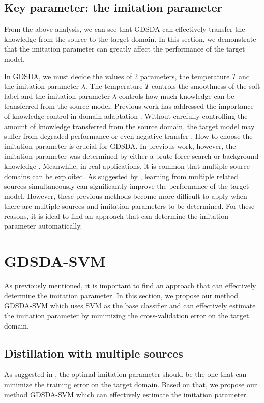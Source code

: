 \subsection{Key parameter: the imitation parameter}\label{sec:aaai:key}
From the above analysis, we can see that GDSDA can effectively transfer the knowledge from the source to the target domain. In this section, we demonstrate that the imitation parameter can greatly affect the performance of the target model.

In GDSDA, we must decide the values of 2 parameters, the temperature $T$ and the imitation parameter $\lambda$. The temperature $T$ controls the smoothness of the soft label and the imitation parameter $\lambda$ controls how much knowledge can be transferred from the source model. Previous work has addressed the importance of knowledge control in domain adaptation \cite{duan2012learning,duan2012visual}. Without carefully controlling the amount of knowledge transferred from the source domain, the target model may suffer from degraded performance or even negative transfer \cite{pan2010survey}.
How to choose the imitation parameter is crucial for GDSDA. In previous work, however, the imitation parameter was determined by either a brute force search \cite{lopez2015unifying} or background knowledge \cite{Tzeng_2015_ICCV}. Meanwhile, in real applications, it is common that  multiple source domains can be exploited. As suggested by \cite{tommasi2014learning}, learning from multiple related sources simultaneously can significantly improve the performance of the target model. However, these previous methods become more difficult to apply when there are multiple sources and imitation parameters to be determined.
For these reasons, it is ideal to find an approach that can determine the imitation parameter automatically.

\section{GDSDA-SVM}\label{sec:aaai:svm}
As previously mentioned, it is important to find an approach that can effectively determine the imitation parameter. In this section, we propose our method GDSDA-SVM which uses SVM as the base classifier and can effectively estimate the imitation parameter by minimizing the cross-validation error on the target domain.
\subsection{Distillation with multiple sources}
As suggested in \cite{vapnik2015learning}, the optimal imitation parameter should be the one that can minimize the training error on the target domain. Based on that, we propose our method GDSDA-SVM which can effectively estimate the imitation parameter.

